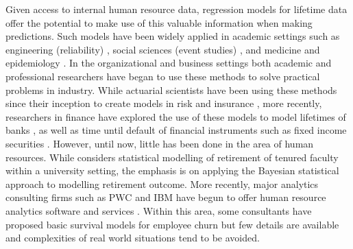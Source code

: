 \documentclass[12pt,letterpaper]{article}
\begin{document}
Given access to internal human resource data, regression models for lifetime data offer the potential to make use of this valuable information when making predictions.  Such models have been widely applied in academic settings such as engineering (reliability) \citep{lawless2011}
, social sciences (event studies) \citep{allison2010,long2006}, and medicine and epidemiology \citep{kalbfleisch2011,Kleinmoeschberger2003}.  In the organizational and business settings both academic and professional researchers have began to use these methods to solve practical problems in industry. While actuarial scientists have been using these methods since their inception to create models in risk and insurance \citep{brockett2008}, more recently, researchers in finance have explored the use of these models to model lifetimes of banks \citep{Lane1986}, as well as time until default of financial instruments such as fixed income securities \citep{leclere2005}.
However, until now, little has been done in the area of human resources.   While \citet{berger1993} considers statistical modelling of retirement of tenured faculty within a university setting, the emphasis is on applying the Bayesian statistical approach to modelling retirement outcome.  More recently, major analytics consulting firms such as PWC and IBM have begun to offer human resource analytics software and services \citep{IBM,PWC}.  Within this area, some consultants have proposed basic survival models for employee churn \citep{briggs2015} but few details are available and complexities of real world situations tend to be avoided.

\end{document}
